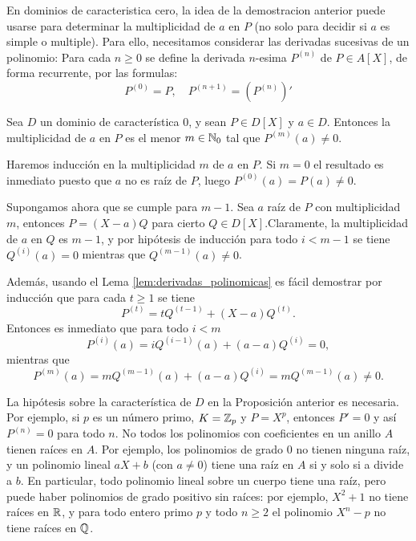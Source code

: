 En dominios de caracteristica cero, la idea de la demostracion anterior puede usarse para determinar la multiplicidad de $a$ en $P$ (no solo para decidir si $a$ es simple o multiple). Para ello, necesitamos considerar las derivadas sucesivas de un polinomio: Para cada $n\geq 0$ se define la derivada $n$-esima $P^{(n)}$ de $P\in A[X]$, de forma recurrente, por las formulas:
\[
P^{(0)} = P,\quad P^{(n+1)} = \left( P^{(n)} \right)'
\]

\begin{proposition}{}{}
Sea $D$ un dominio de característica 0, y sean $P \in D[X]$ y $a \in D$. Entonces la multiplicidad de $a$ en $P$ es el menor $m \in \mathbb{N}_0$ tal que $P^{(m)}(a) \neq 0$.
\end{proposition}

\begin{proofbox}
Haremos inducción en la multiplicidad $m$ de $a$ en $P$. Si $m = 0$ el resultado es inmediato puesto que $a$ no es raíz de $P$, luego $P^{(0)}(a) = P(a) \neq 0$.

Supongamos ahora que se cumple para $m-1$. Sea $a$ raíz de $P$ con multiplicidad $m$, entonces $P = (X - a)Q$ para cierto $Q \in D[X]$.Claramente, la multiplicidad de $a$ en $Q$ es $m - 1$, y por hipótesis de inducción para todo $i < m - 1$ se tiene $Q^{(i)}(a) = 0$ mientras que $Q^{(m-1)}(a) \neq 0$.

Además, usando el Lema \ref{lem:derivadas_polinomicas} es fácil demostrar por inducción que para cada $t \geq 1$ se tiene
\[
P^{(t)} = tQ^{(t-1)} + (X - a)Q^{(t)}.
\]
Entonces es inmediato que para todo $i < m$
\[
P^{(i)}(a) = iQ^{(i-1)}(a) + (a - a)Q^{(i)} = 0,
\]
mientras que 
\[
P^{(m)}(a) = mQ^{(m-1)}(a) + (a - a)Q^{(i)} = mQ^{(m-1)}(a) \neq 0.
\]
\end{proofbox}

La hipótesis sobre la característica de $D$ en la Proposición anterior es necesaria. Por ejemplo, si $p$ es un número primo, $K = \mathbb{Z}_p$ y $P = X^p$, entonces $P' = 0$ y así $P^{(n)} = 0$ para todo $n$. No todos los polinomios con coeficientes en un anillo $A$ tienen raíces en $A$. Por ejemplo, los polinomios de grado 0 no tienen ninguna raíz, y un polinomio lineal $aX + b$ (con $a \neq 0$) tiene una raíz en $A$ si y solo si a divide a $b$. En particular, todo polinomio lineal sobre un cuerpo tiene una raíz, pero puede haber polinomios de grado positivo sin raíces: por ejemplo, $X^2 + 1$ no tiene raíces en $\mathbb{R}$, y para todo entero primo $p$ y todo $n \geq 2$ el polinomio $X^n - p$ no tiene raíces en $\mathbb{Q}$.
